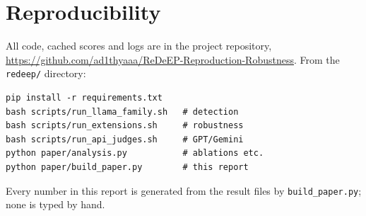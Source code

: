 \documentclass[conference]{IEEEtran}
\begin{document}
\section{Reproducibility}
All code, cached scores and logs are in the project repository, \url{https://github.com/ad1thyaaa/ReDeEP-Reproduction-Robustness}. From the \texttt{redeep/} directory:
\begin{footnotesize}
\begin{verbatim}
pip install -r requirements.txt
bash scripts/run_llama_family.sh   # detection
bash scripts/run_extensions.sh     # robustness
bash scripts/run_api_judges.sh     # GPT/Gemini
python paper/analysis.py           # ablations etc.
python paper/build_paper.py        # this report
\end{verbatim}
\end{footnotesize}
Every number in this report is generated from the result files by \texttt{build\_paper.py}; none is typed by hand.
\end{document}
